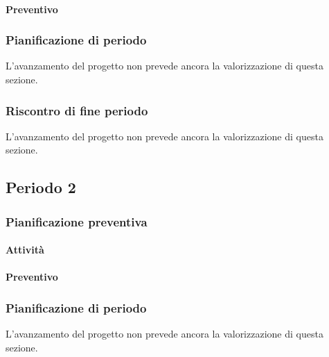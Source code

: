 \paragraph{Preventivo}

\smallPreventivoTable{
	
}

\subsubsection{Pianificazione di periodo}

L'avanzamento del progetto non prevede ancora la valorizzazione di questa sezione.


\subsubsection{Riscontro di fine periodo}


L'avanzamento del progetto non prevede ancora la valorizzazione di questa sezione.



\subsection{Periodo 2}

\subsubsection{Pianificazione preventiva}

\paragraph{Attività}

\planningTable{
	
}

\paragraph{Preventivo}

\smallPreventivoTable{
	
}

\subsubsection{Pianificazione di periodo}


L'avanzamento del progetto non prevede ancora la valorizzazione di questa sezione.



